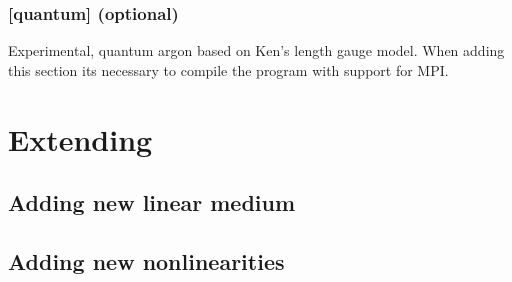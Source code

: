 \documentclass{article}
\begin{document}
\subsubsection{[quantum] (optional)}
Experimental, quantum argon based on Ken's length gauge model. When
adding this section its necessary to compile the program with support
for MPI.

\section{Extending}
\subsection{Adding new linear medium}
\subsection{Adding new nonlinearities}
\end{document}
